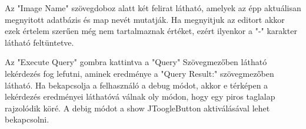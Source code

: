Az "Image Name" szövegdoboz alatt két felirat látható, amelyek az épp aktuálisan megnyitott adatbázis és map nevét mutatják. Ha megnyitjuk az editort akkor ezek értelem szerűen még nem tartalmaznak értéket, ezért ilyenkor a "-" karakter látható feltüntetve.

Az "Execute Query" gombra kattintva a "Query" Szövegmezőben látható lekérdezés fog lefutni, aminek eredménye a "Query Result:" szövegmezőben látható. Ha bekapcsolja a felhasználó a debug módot, akkor e térképen a lekérdezés eredményei láthatóvá válnak oly módon, hogy egy piros taglalap rajzolódik köré. A debig módot a show JToogleButton aktiválásával lehet bekapcsolni. 

